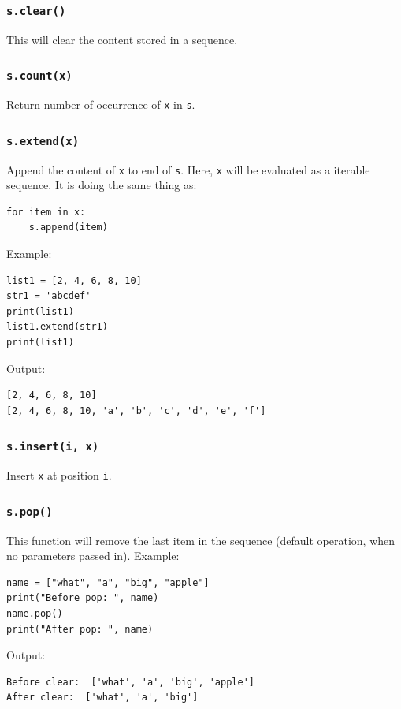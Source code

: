\documentclass[12pt]{book}
\begin{document}
\subsubsection{\texttt{s.clear()}}
\label{sec:org332fbef}
This will clear the content stored in a sequence.
\subsubsection{\texttt{s.count(x)}}
\label{sec:org3f67067}
Return number of occurrence of \texttt{x} in \texttt{s}.

\subsubsection{\texttt{s.extend(x)}}
\label{sec:org9d25464}
Append the content of \texttt{x} to end of \texttt{s}. Here, \texttt{x} will be evaluated as a iterable sequence. It is doing the same thing as:
\begin{verbatim}
for item in x:
    s.append(item)
\end{verbatim}
Example:
\begin{verbatim}
list1 = [2, 4, 6, 8, 10]
str1 = 'abcdef'
print(list1)
list1.extend(str1)
print(list1)
\end{verbatim}
Output:
\begin{verbatim}
[2, 4, 6, 8, 10]
[2, 4, 6, 8, 10, 'a', 'b', 'c', 'd', 'e', 'f']
\end{verbatim}

\subsubsection{\texttt{s.insert(i, x)}}
\label{sec:orgaa63857}
Insert \texttt{x} at position \texttt{i}.

\subsubsection{\texttt{s.pop()}}
\label{sec:org10a8c54}
This function will remove the last item in the sequence (default operation, when no parameters passed in). Example:
\begin{verbatim}
name = ["what", "a", "big", "apple"]
print("Before pop: ", name)
name.pop()
print("After pop: ", name)
\end{verbatim}
Output:
\begin{verbatim}
Before clear:  ['what', 'a', 'big', 'apple']
After clear:  ['what', 'a', 'big']
\end{verbatim}
\end{document}
